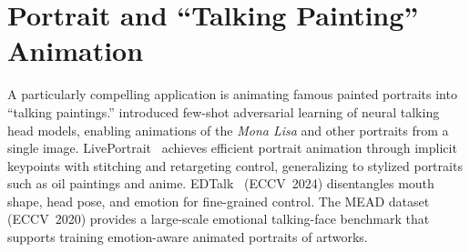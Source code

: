 \section{Portrait and ``Talking Painting'' Animation}
\label{sec:portrait}

A particularly compelling application is animating famous painted portraits into
``talking paintings.'' \citet{zakharov2019fewshot} introduced few-shot adversarial
learning of neural talking head models, enabling animations of the \textit{Mona Lisa}
and other portraits from a single image. LivePortrait~\cite{guo2024liveportrait}
achieves efficient portrait animation through implicit keypoints with stitching and
retargeting control, generalizing to stylized portraits such as oil paintings and anime.
EDTalk~\cite{tan2024edtalk} (ECCV~2024) disentangles mouth shape, head pose, and emotion
for fine-grained control. The MEAD dataset~\cite{wang2020mead} (ECCV~2020) provides a
large-scale emotional talking-face benchmark that supports training emotion-aware
animated portraits of artworks.
